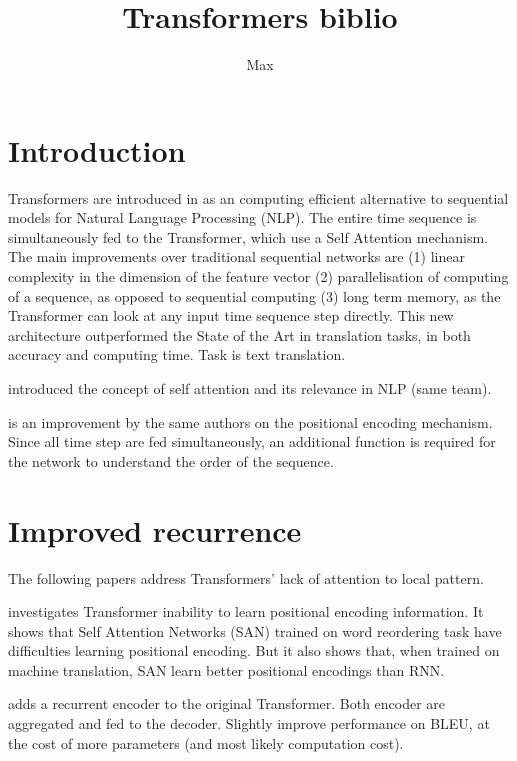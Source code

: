 \documentclass{article}
\title{Transformers biblio}
\author{Max}
\begin{document}
\maketitle

\section{Introduction}

    Transformers are introduced in \cite{Vaswani2017AttentionIA} as an computing efficient alternative to sequential models for Natural Language Processing (NLP). The entire time sequence is simultaneously fed to the Transformer, which use a Self Attention mechanism. The main improvements over traditional sequential networks are (1) linear complexity in the dimension of the feature vector (2) parallelisation of computing of a sequence, as opposed to sequential computing (3) long term memory, as the Transformer can look at any input time sequence step directly. This new architecture outperformed the State of the Art in translation tasks, in both accuracy and computing time. Task is text translation.

    \cite{Parikh2016ADA} introduced the concept of self attention and its relevance in NLP (same team).

    \cite{Shaw2018SelfAttentionWR} is an improvement by the same authors on the positional encoding mechanism. Since all time step are fed simultaneously, an additional function is required for the network to understand the order of the sequence.


\section{Improved recurrence}

    The following papers address Transformers' lack of attention to local pattern.

    \cite{Yang2019AssessingTA} investigates Transformer inability to learn positional encoding information. It shows that Self Attention Networks (SAN) trained on word reordering task have difficulties learning positional encoding. But it also shows that, when trained on machine translation, SAN learn better positional encodings than RNN.

    \cite{Hao2019ModelingRF} adds a recurrent encoder to the original Transformer. Both encoder are aggregated and fed to the decoder. Slightly improve performance on BLEU, at the cost of more parameters (and most likely computation cost).
\end{document}

